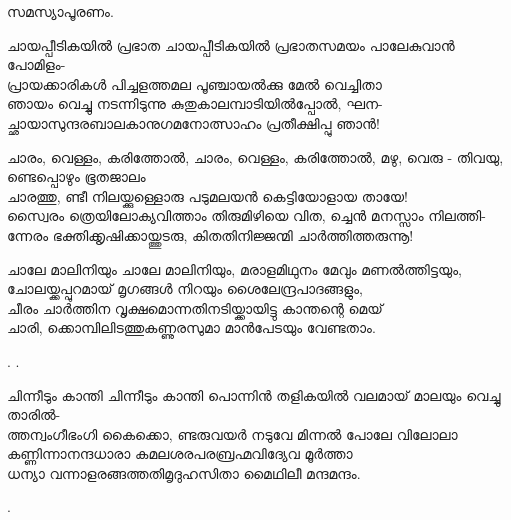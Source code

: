 \begin{enumerate}
സമസ്യാപൂരണം. 



\begin{slokam}{\VSv}{\VKG}{ചായപ്പീടികയിൽ പ്രഭാത}
ചായപ്പീടികയിൽ പ്രഭാതസമയം പാലേകുവാൻ പോമിളം-\\
പ്രായക്കാരികൾ പിച്ചളത്തമല പൂഞ്ചായൽക്കു മേൽ വെച്ചിതാ\\
ഞായം വെച്ചു നടന്നിടുന്നു കുതുകാലമ്പാടിയിൽപ്പോൽ, ഘന-\\
ച്ഛായാസുന്ദരബാലകാനുഗമനോത്സാഹം പ്രതീക്ഷിപ്പു ഞാൻ! 
\end{slokam}


\begin{slokam}{\VSr}{\VNM}{ചാരം, വെള്ളം, കരിത്തോൽ,}
ചാരം, വെള്ളം, കരിത്തോൽ, മഴു, വെരു - തിവയു, ണ്ടെപ്പൊഴും ഭൂതജാലം \\
ചാരത്തു, ണ്ടീ നിലയ്ക്കുള്ളൊരു പടുമലയൻ കെട്ടിയോളായ തായേ! \\
സ്വൈരം ത്രെയിലോക്യവിത്താം തിരുമിഴിയെ വിത, ച്ചെൻ മനസ്സാം നിലത്തി-\\
ന്നേരം ഭക്തിക്കൃഷിക്കായ്ത്തുടരു, കിതതിനിജ്ജന്മി ചാർത്തിത്തരുന്നൂ!
\end{slokam}


\begin{slokam}{\VSv}{\ARRV}{ചാലേ മാലിനിയും}
ചാലേ മാലിനിയും, മരാളമിഥുനം മേവും മണല്‍ത്തിട്ടയും,\\
ചോലയ്ക്കപ്പുറമായ്‌ മൃഗങ്ങള്‍ നിറയും ശൈലേന്ദ്രപാദങ്ങളും,\\
ചീരം ചാര്‍ത്തിന വൃക്ഷമൊന്നതിനടിയ്ക്കായിട്ടു കാന്തന്റെ മെയ്‌\\
ചാരി, ക്കൊമ്പിലിടത്തുകണ്ണുരസുമാ മാന്‍പേടയും വേണ്ടതാം.
\end{slokam}


. .

\begin{slokam}{\VSr}{\Punam}{ചിന്നീടും കാന്തി}
ചിന്നീടും കാന്തി പൊന്നിൻ തളികയിൽ വലമായ് മാലയും വെച്ചു താരിൽ-\\ 
ത്തന്വംഗീഭംഗി കൈക്കൊ, ണ്ടരുവയർ നടുവേ മിന്നൽ പോലേ വിലോലാ \\
കണ്ണിന്നാനന്ദധാരാ കമലശരപരബ്രഹ്മവിദ്യേവ മൂർത്താ \\
ധന്യാ വന്നാളരങ്ങത്തതിമൃദുഹസിതാ മൈഥിലീ മന്ദമന്ദം. 
\end{slokam}



.


\end{enumerate}

